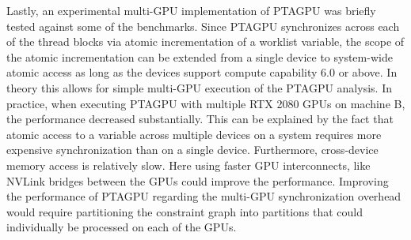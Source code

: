 Lastly, an experimental multi-GPU implementation of PTAGPU was briefly tested against some of the benchmarks.
Since PTAGPU synchronizes across each of the thread blocks via atomic incrementation of a worklist variable, the scope of the atomic incrementation can be extended from a single device to system-wide atomic access as long as the devices support compute capability 6.0 or above.
In theory this allows for simple multi-GPU execution of the PTAGPU analysis.
In practice, when executing PTAGPU with multiple RTX 2080 GPUs on machine B, the performance decreased substantially.
This can be explained by the fact that atomic access to a variable across multiple devices on a system requires more expensive synchronization than on a single device.
Furthermore, cross-device memory access is relatively slow. Here using faster GPU interconnects, like NVLink bridges between the GPUs could improve the performance.
Improving the performance of PTAGPU regarding the multi-GPU synchronization overhead would require partitioning the constraint graph into partitions that could individually be processed on each of the GPUs.
